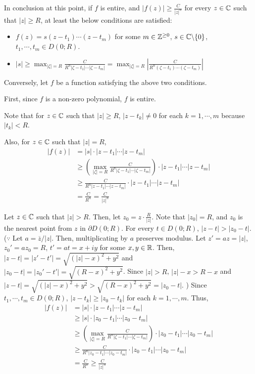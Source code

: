 In conclusion at this point, if \(f\) is entire, and \(|f(z)| \ge \frac{C}{|z|^n}\) for every \(z \in \mathbb{C}\) such that \(|z| \ge R\), at least the below conditions are satisfied:
\begin{itemize}
\item \(f(z) = s(z - t_1) \cdots (z - t_m)\) for some \(m \in \mathbb{Z}^{\ge 0}\), \(s \in \bbC \bs \{0\}\), \(t_1, \cdots, t_m \in D(0; R)\).
\item \(|s| \ge \max_{|\zeta| = R} \frac{C}{R^n |\zeta - t_1| \cdots |\zeta - t_m|}
    = \max_{|\zeta| = R} \left| \frac{C}{R^n (\zeta - t_1) \cdots (\zeta - t_m)} \right|\)
\end{itemize}

Conversely, let \(f\) be a function satisfying the above two conditions.

First, since \(f\) is a non-zero polynomial, \(f\) is entire.

Note that for \(z \in \mathbb{C}\) such that \(|z| \ge R\), \(|z - t_k| \neq 0\) for each \(k = 1, \cdots, m\) because \(|t_k| < R\).

Also, for \(z \in \mathbb{C}\) such that \(|z| = R\),
\begin{align*}
  |f(z)|
  &= |s| \cdot |z - t_1| \cdots |z - t_m|
  \\&\ge \left( \max_{|\zeta| = R} \frac{C}{R^n |\zeta - t_1| \cdots |\zeta - t_m|} \right)
    \cdot |z - t_1| \cdots |z - t_m|
  \\&\ge \frac{C}{R^n |z - t_1| \cdots |z - t_m|}
    \cdot |z - t_1| \cdots |z - t_m|
  \\&= \frac{C}{R^n} = \frac{C}{|z|^n}
\end{align*}

Let \(z \in \mathbb{C}\) such that \(|z| > R\).
Then, let \(z_0 = z \cdot \frac{R}{|z|}\).
Note that \(|z_0| = R\), and \(z_0\) is the nearest point from \(z\) in \(\partial D(0; R)\).
For every \(t \in D(0; R)\),
\(|z - t| > |z_0 - t|\).
(\(\because\) Let \(a = \overline{z} / |z|\). Then, multiplicating by \(a\) preserves modulus.
Let \(z' = az = |z|\), \(z_0' = az_0 = R\), \(t' = at = x + iy\) for some \(x, y \in \mathbb{R}\).
Then, \(|z - t| = |z' - t'| = \sqrt{(|z| - x)^2 + y^2}\)
and \(|z_0 - t| = |z_0' - t'| = \sqrt{(R - x)^2 + y^2}\).
Since \(|z| > R\), \(|z| - x > R - x\) and
\(|z - t| = \sqrt{(|z| - x)^2 + y^2} > \sqrt{(R - x)^2 + y^2} = |z_0 - t|\).
)
Since \(t_1, \cdots, t_m \in D(0; R)\), \(|z - t_k| \ge |z_0 - t_k|\) for each \(k = 1, \cdots, m\).
Thus,
\begin{align*}
  |f(z)|
  &= |s| \cdot |z - t_1| \cdots |z - t_m|
  \\&\ge |s| \cdot |z_0 - t_1| \cdots |z_0 - t_m|
  \\&\ge \left( \max_{|\zeta| = R} \frac{C}{R^n |\zeta - t_1| \cdots |\zeta - t_m|} \right)
    \cdot |z_0 - t_1| \cdots |z_0 - t_m|
  \\&\ge \frac{C}{R^n |z_0 - t_1| \cdots |z_0 - t_m|} \cdot |z_0 - t_1| \cdots |z_0 - t_m|
  \\&= \frac{C}{R^n}
  \ge \frac{C}{|z|^n}
\end{align*}

